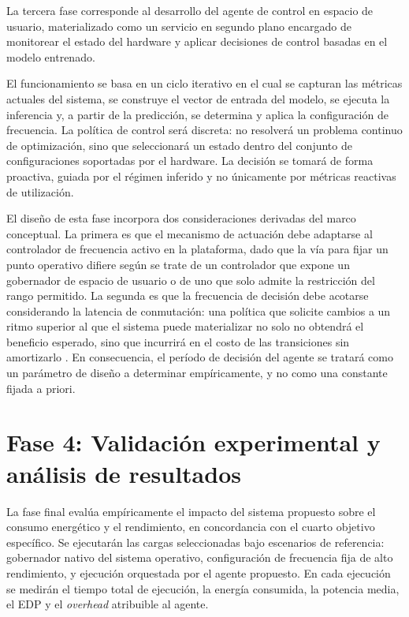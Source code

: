 \documentclass[12pt,oneside,spanish]{book}
\begin{document}
La tercera fase corresponde al desarrollo del agente de control en espacio de usuario, materializado como un servicio en segundo plano encargado de monitorear el estado del hardware y aplicar decisiones de control basadas en el modelo entrenado.

El funcionamiento se basa en un ciclo iterativo en el cual se capturan las métricas actuales del sistema, se construye el vector de entrada del modelo, se ejecuta la inferencia y, a partir de la predicción, se determina y aplica la configuración de frecuencia. La política de control será discreta: no resolverá un problema continuo de optimización, sino que seleccionará un estado dentro del conjunto de configuraciones soportadas por el hardware. La decisión se tomará de forma proactiva, guiada por el régimen inferido y no únicamente por métricas reactivas de utilización.

El diseño de esta fase incorpora dos consideraciones derivadas del marco conceptual. La primera es que el mecanismo de actuación debe adaptarse al controlador de frecuencia activo en la plataforma, dado que la vía para fijar un punto operativo difiere según se trate de un controlador que expone un gobernador de espacio de usuario o de uno que solo admite la restricción del rango permitido. La segunda es que la frecuencia de decisión debe acotarse considerando la latencia de conmutación: una política que solicite cambios a un ritmo superior al que el sistema puede materializar no solo no obtendrá el beneficio esperado, sino que incurrirá en el costo de las transiciones sin amortizarlo \cite{Hebbar2022,Velicka2025}. En consecuencia, el período de decisión del agente se tratará como un parámetro de diseño a determinar empíricamente, y no como una constante fijada a priori.

\section{Fase 4: Validación experimental y análisis de resultados}

La fase final evalúa empíricamente el impacto del sistema propuesto sobre el consumo energético y el rendimiento, en concordancia con el cuarto objetivo específico. Se ejecutarán las cargas seleccionadas bajo escenarios de referencia: gobernador nativo del sistema operativo, configuración de frecuencia fija de alto rendimiento, y ejecución orquestada por el agente propuesto. En cada ejecución se medirán el tiempo total de ejecución, la energía consumida, la potencia media, el EDP y el \textit{overhead} atribuible al agente.
\end{document}
